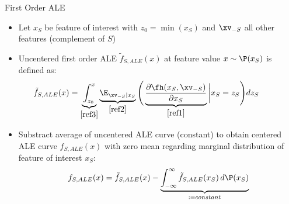 \documentclass[11pt,compress,t,notes=noshow, aspectratio=169, xcolor=table]{beamer}
\begin{document}


\begin{frame}{First Order ALE}

\begin{itemize}%
\item Let $x_S$ be feature of interest with $z_0 = \min(x_S)$ and $\xv_{-S}$ all other features  (complement of $S$)
\item Uncentered first order ALE $\tilde{f}_{S, ALE}(x)$ at feature value $x \sim \P(x_S)$ is defined as:  
$$
\begin{aligned}
\hspace*{-0.7cm} 
\tilde{f}_{S, ALE}(x) &= \underbrace{\int_{z_{0}}^{x}}_{ \eqref{ref3}} \underbrace{\E_{\xv_{-S} \vert x_S}}_{\eqref{ref2}} \Bigg(  \underbrace{\frac{\partial \fh(x_S, \xv_{-S})}{\partial x_S}}_{\eqref{ref1}} \bigg \vert x_S = z_S \Bigg) dz_S %
\end{aligned}
$$
\pause
\item Substract average of uncentered ALE curve (constant) to obtain centered ALE curve $f_{S, ALE}(x)$ with zero mean regarding marginal distribution of feature of interest $x_S$:
$$
\begin{aligned}
f_{S, ALE}(x) = \tilde{f}_{S, ALE}(x) - \underbrace{\int_{-\infty}^{\infty}\tilde{f}_{S, ALE}(x_S) \, d\P(x_S)}_{:= constant}
\end{aligned}
$$
\end{itemize}



\end{frame}
\end{document}
